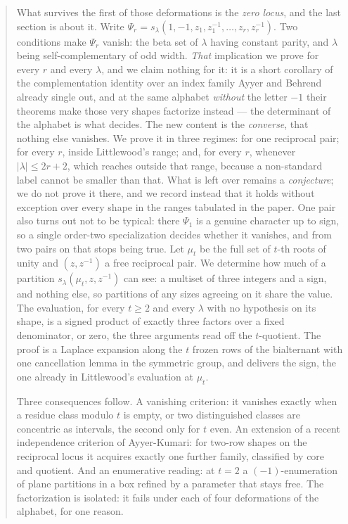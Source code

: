\documentclass[11pt,reqno]{amsart}
\theoremstyle{plain}
\theoremstyle{definition}
\newcommand{\zt}{\mu_t}
\begin{document}
\begin{abstract}
What survives the first of those deformations is the \emph{zero locus}, and the last section is about
it. Write $\Psi_r=s_\lambda(1,-1,z_1,z_1^{-1},\dots,z_r,z_r^{-1})$. Two conditions make $\Psi_r$
vanish: the beta set of $\lambda$ having constant parity, and $\lambda$ being self-complementary of
odd width. \emph{That} implication we prove for every $r$ and every $\lambda$, and we claim nothing
for it: it is a short corollary of the complementation identity over an index family Ayyer and
Behrend already single out, and at the same alphabet \emph{without} the letter $-1$ their theorems
make those very shapes factorize instead --- the determinant of the alphabet is what decides.
The new content is the \emph{converse}, that nothing else vanishes. We prove it in three regimes: for
one reciprocal pair; for every $r$, inside Littlewood's range; and, for every $r$, whenever
$|\lambda|\le2r+2$, which reaches outside that range, because a non-standard label cannot be smaller
than that. What is left over remains a \emph{conjecture}; we do not prove it there, and we record
instead that it holds without exception over every shape in the ranges tabulated in the paper. One pair also turns out not to be typical:
there $\Psi_1$ is a genuine character up to sign, so a single order-two specialization decides
whether it vanishes, and from two pairs on that stops being true.
\else
Let $\zt$ be the full set of $t$-th roots of unity and $(z,z^{-1})$ a free reciprocal pair. We
determine how much of a partition $s_\lambda(\zt,z,z^{-1})$ can see: a multiset of three integers
and a sign, and nothing else, so partitions of any sizes agreeing on it share the value. The
evaluation, for every $t\ge2$ and every $\lambda$ with no hypothesis on its shape, is a signed
product of exactly three factors over a fixed denominator, or zero, the three arguments read off
the $t$-quotient. The
proof is a Laplace expansion along the $t$ frozen rows of the bialternant with one cancellation lemma
in the symmetric group, and delivers the sign, the one already in Littlewood's evaluation at
$\zt$.

Three consequences follow. A vanishing criterion: it vanishes exactly when a residue class
modulo $t$ is empty, or two distinguished classes are concentric as intervals, the second only for
$t$ even. An extension of a recent independence criterion of Ayyer-Kumari: for two-row
shapes on the reciprocal locus it acquires exactly one further family, classified by core and quotient. And an
enumerative reading: at $t=2$ a $(-1)$-enumeration of plane partitions in a box refined by a
parameter that stays free. The factorization is isolated: it fails under each of four
deformations of the alphabet, for one reason.


\end{abstract}
\end{document}
